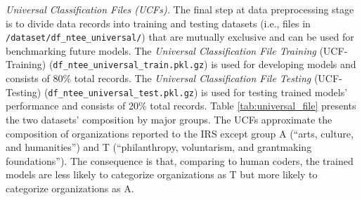 \documentclass[11pt]{article}
\begin{document}
\textit{Universal Classification Files (UCFs).} The final step at data preprocessing stage is to divide data records into training and testing datasets (i.e., files in \texttt{/dataset/df\_ntee\_universal/}) that are mutually exclusive and can be used for benchmarking future models. The \textit{Universal Classification File Training} (UCF-Training) (\texttt{df\_ntee\_universal\_train.pkl.gz}) is used for developing models and consists of 80\% total records. The \textit{Universal Classification File Testing} (UCF-Testing) (\texttt{df\_ntee\_universal\_test.pkl.gz}) is used for testing trained models' performance and consists of 20\% total records. Table \ref{tab:universal_file} presents the two datasets' composition by major groups. The UCFs approximate the composition of organizations reported to the IRS except group A (``arts, culture, and humanities'') and T (``philanthropy, voluntarism, and grantmaking foundations''). The consequence is that, comparing to human coders, the trained models are less likely to categorize organizations as T but more likely to categorize organizations as A.
\end{document}
